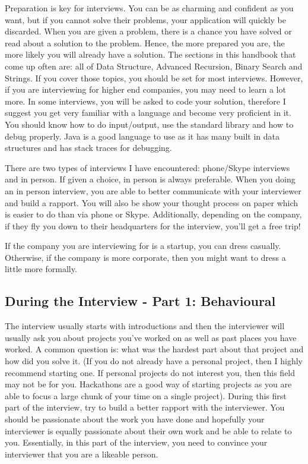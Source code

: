 \documentclass[11pt,oneside]{book}
\begin{document}
Preparation is key for interviews. You can be as charming and confident as you want, but
    if you cannot solve their problems, your application will quickly be discarded. When you 
    are given a problem, there is a chance you have solved or read about a solution to the
    problem. Hence, the more prepared you are, the more likely you will already have a 
    solution. The sections in this handbook that come up often are: all of Data Structure,
    Advanced Recursion, Binary Search and Strings. If you cover those topics, you should be set 
    for most interviews. However, if you are interviewing for higher end companies, you may need to learn
    a lot more. In some interviews, you will be asked to code your solution, therefore I suggest you 
    get very familiar with a language and become very proficient in it. You should know how to 
    do input/output, use the standard library and how to debug properly. Java is a good language to use
    as it has many built in data structures and has stack traces for debugging.

There are two types of interviews I have encountered: phone/Skype interviews and in person. 
    If given a choice, in person is always preferable. When you doing an in person interview, 
    you are able to better communicate with your interviewer and build a rapport. You will also be 
    show your thought process on paper which is easier to do than via phone or Skype. Additionally, 
    depending on the company, if they fly you down to their headquarters for the interview, 
    you'll get a free trip!

If the company you are interviewing for is a startup, you can dress casually. Otherwise, if the
    company is more corporate, then you might want to dress a little more formally.

\subsection{During the Interview - Part 1: Behavioural}

The interview usually starts with introductions and then the interviewer will usually ask you
    about projects you've worked on as well as past places you have worked. A common question is:
    what was the hardest part about that project and how did you solve it. (If you do not already
    have a personal project, then I highly recommend starting one. If personal projects do not
    interest you, then this field may not be for you. Hackathons are a good way of starting projects
    as you are able to focus a large chunk of your time on a single project). During this first part of the interview,
    try to build a better rapport with the interviewer. You should be passionate about the work you have done
    and hopefully your interviewer is equally passionate about their own work and be able to relate to you. 
    Essentially, in this part of the interview, you need to convince your interviewer that you are a likeable person.
\end{document}
